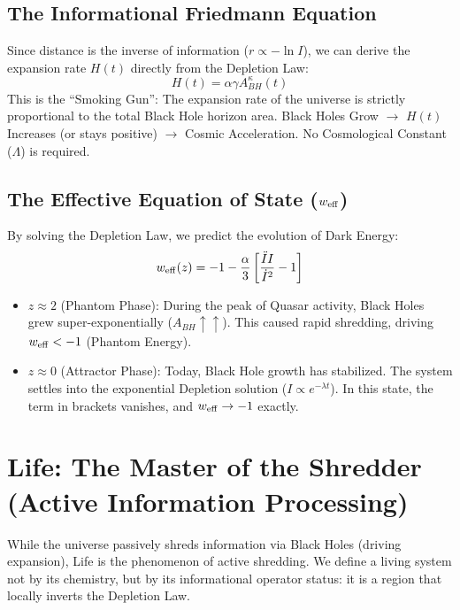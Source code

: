 \documentclass{article}
\begin{document}
\subsection{The Informational Friedmann Equation}
Since distance is the inverse of information ($r \propto -\ln I$), we can derive the expansion rate $H(t)$ directly from the Depletion Law:
\begin{equation}
    \boxed{H(t) = \alpha \gamma A_{BH}^\kappa(t)}
\end{equation}
This is the ``Smoking Gun'': The expansion rate of the universe is strictly proportional to the total Black Hole horizon area.
Black Holes Grow $\to$ $H(t)$ Increases (or stays positive) $\to$ Cosmic Acceleration.
No Cosmological Constant ($\Lambda$) is required.

\subsection{The Effective Equation of State ($w_{\rm eff}$)}
By solving the Depletion Law, we predict the evolution of Dark Energy:
\begin{equation}
    w_{\rm eff}(z) = -1 - \frac{\alpha}{3} \left[ \frac{\ddot{I} I}{\dot{I}^2} - 1 \right]
\end{equation}
\begin{itemize}
    \item $z \approx 2$ (Phantom Phase): During the peak of Quasar activity, Black Holes grew super-exponentially ($A_{BH} \uparrow\uparrow$). This caused rapid shredding, driving $w_{\rm eff} < -1$ (Phantom Energy).
    \item $z \approx 0$ (Attractor Phase): Today, Black Hole growth has stabilized. The system settles into the exponential Depletion solution ($I \propto e^{-\lambda t}$). In this state, the term in brackets vanishes, and $w_{\rm eff} \to -1$ exactly.
\end{itemize}

\section{Life: The Master of the Shredder (Active Information Processing)}
While the universe passively shreds information via Black Holes (driving expansion), Life is the phenomenon of active shredding. We define a living system not by its chemistry, but by its informational operator status: it is a region that locally inverts the Depletion Law.
\end{document}
